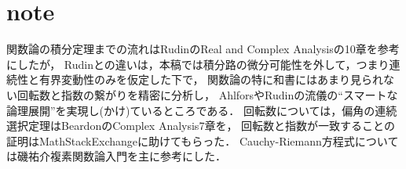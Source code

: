 \section{note}
	関数論の積分定理までの流れはRudinのReal and Complex Analysisの10章を参考にしたが，
	Rudinとの違いは，本稿では積分路の微分可能性を外して，つまり連続性と有界変動性のみを仮定した下で，
	関数論の特に和書にはあまり見られない回転数と指数の繋がりを精密に分析し，
	AhlforsやRudinの流儀の``スマートな論理展開''を実現し(かけ)ているところである．
	回転数については，偏角の連続選択定理はBeardonのComplex Analysis7章を，
	回転数と指数が一致することの証明はMathStackExchangeに助けてもらった．
	Cauchy-Riemann方程式については磯祐介複素関数論入門を主に参考にした．